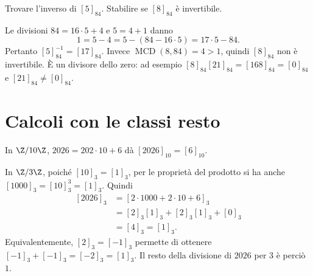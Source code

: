\begin{esercizio}
Trovare l'inverso di $[5]_{84}$. Stabilire se $[8]_{84}$ è invertibile.
\end{esercizio}
\begin{svolgimento}
Le divisioni $84=16\cdot5+4$ e $5=4+1$ danno
\[
1=5-4=5-(84-16\cdot5)=17\cdot5-84.
\]
Pertanto $[5]_{84}^{-1}=[17]_{84}$. Invece $\operatorname{MCD}(8,84)=4>1$, quindi $[8]_{84}$ non è invertibile. È un divisore dello zero: ad esempio $[8]_{84}[21]_{84}=[168]_{84}=[0]_{84}$ e $[21]_{84}\ne[0]_{84}$.
\end{svolgimento}

\section{Calcoli con le classi resto}
\begin{esempio}[Il numero 2026]
In $\Z/10\Z$, $2026=202\cdot10+6$ dà $[2026]_{10}=[6]_{10}$.

In $\Z/3\Z$, poiché $[10]_3=[1]_3$, per le proprietà del prodotto si ha anche $[1000]_3=[10]_3^3=[1]_3$. Quindi
\[
\begin{aligned}
[2026]_3&=[2\cdot1000+2\cdot10+6]_3\\
&=[2]_3[1]_3+[2]_3[1]_3+[0]_3\\
&=[4]_3=[1]_3.
\end{aligned}
\]
Equivalentemente, $[2]_3=[-1]_3$ permette di ottenere $[-1]_3+[-1]_3=[-2]_3=[1]_3$. Il resto della divisione di $2026$ per $3$ è perciò $1$.
\end{esempio}
